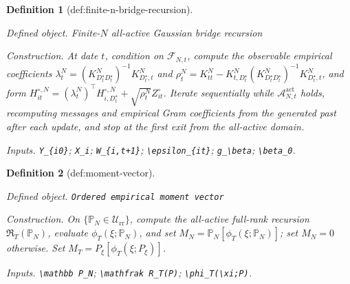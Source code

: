 \documentclass{article}
\newtheorem{definition}{Definition}
\begin{document}
\begin{definition}[def:finite-n-bridge-recursion]\label{def:finite-n-bridge-recursion}
\par\smallskip\noindent\emph{Defined object.} Finite-\(N\) all-active Gaussian bridge recursion
\par\smallskip\noindent\emph{Construction.} At date \(t\), condition on \(\mathscr F_{N,t}\), compute the observable empirical coefficients \(\lambda_t^{N}=(K_{D_t^{\star}D_t^{\star}}^{N})^{-1}K_{D_t^{\star},t}^{N}\) and \(\rho_t^{N}=K_{tt}^{N}-K_{t,D_t^{\star}}^{N}(K_{D_t^{\star}D_t^{\star}}^{N})^{-1}K_{D_t^{\star},t}^{N}\), and form \(H_{it}^{\circ,N}=(\lambda_t^{N})^{\top}H_{i,D_t^{\star}}^{\circ,N}+\sqrt{\rho_t^{N}}Z_{it}^{\circ}\). Iterate sequentially while \(\mathcal A_{N,t}^{\mathrm{act}}\) holds, recomputing messages and empirical Gram coefficients from the generated past after each update, and stop at the first exit from the all-active domain.
\par\smallskip\noindent\emph{Inputs.} \texttt{Y\_\allowbreak{}\{i0\}\allowbreak{}}; \texttt{X\_\allowbreak{}i}; \texttt{W\_\allowbreak{}\{i,\allowbreak{}t+\allowbreak{}1\}\allowbreak{}}; \texttt{\textbackslash{}\allowbreak{}epsilon\_\allowbreak{}\{it\}\allowbreak{}}; \texttt{g\_\allowbreak{}\textbackslash{}\allowbreak{}beta}; \texttt{\textbackslash{}\allowbreak{}beta\_\allowbreak{}0}.
\end{definition}

\begin{definition}[def:moment-vector]\label{def:moment-vector}
\par\smallskip\noindent\emph{Defined object.} \texttt{Ordered empirical moment vector}
\par\smallskip\noindent\emph{Construction.} On \(\{\mathbb P_N\in\mathcal U_{\mathrm{rr}}\}\), compute the all-active full-rank recursion \(\mathfrak R_T(\mathbb P_N)\), evaluate \(\phi_T(\xi;\mathbb P_N)\), and set \(M_N=\mathbb P_N[\phi_T(\xi;\mathbb P_N)]\); set \(M_N=0\) otherwise. Set \(M_T=P_\xi[\phi_T(\xi;P_\xi)]\).
\par\smallskip\noindent\emph{Inputs.} \texttt{\textbackslash{}\allowbreak{}mathbb P\_\allowbreak{}N}; \texttt{\textbackslash{}\allowbreak{}mathfrak R\_\allowbreak{}T(P)}; \texttt{\textbackslash{}\allowbreak{}phi\_\allowbreak{}T(\textbackslash{}\allowbreak{}xi;\allowbreak{}P)}.
\end{definition}
\end{document}
